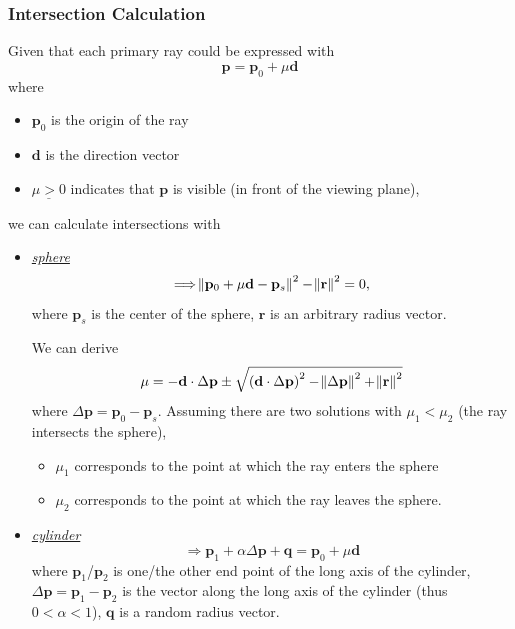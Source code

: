 \documentclass[twocolumn,landscape,10pt]{article}
\theoremstyle{definition}
\begin{document}
\subsubsection{Intersection Calculation}

Given that each primary ray could be expressed with
\[
    \mathbf{p}=\mathbf{p}_0+\mu\mathbf{d}
\]
where
\begin{itemize}
    \item $\mathbf{p}_0$ is the origin of the ray
    \item $\mathbf{d}$ is the direction vector
    \item $\underline{\mu>0}$ indicates that $\mathbf{p}$ is visible 
        (in front of the viewing plane),
\end{itemize} 
we can calculate intersections with
\begin{itemize}
    \item \underline{\emph{sphere}}
        \[
            \Longrightarrow
            \norm{\mathbf{p}_0+\mu\mathbf{d}-\mathbf{p}_s}^2-\norm{\mathbf{r}}^2=0,
        \]
        where $\mathbf{p}_s$ is the center of the sphere, $\mathbf{r}$ is an
        arbitrary radius vector.

        We can derive
        \[
            \mu=-\mathbf{d}\cdot\Delta\mathbf{p}\pm\sqrt{
                {(\mathbf{d}\cdot\Delta\mathbf{p})}^{2}
                -\norm{\Delta\mathbf{p}}^{2}+\norm{\mathbf{r}}^2
            }
        \]
        where $\Delta\mathbf{p}=\mathbf{p}_0-\mathbf{p}_s$.
        Assuming there are two solutions with $\mu_1<\mu_2$ (the ray intersects
        the sphere), 
        \begin{itemize}
            \item $\mu_1$ corresponds to the point at which the ray enters the sphere
            \item $\mu_2$ corresponds to the point at which the ray leaves the sphere.
        \end{itemize} 

    \item \underline{\emph{cylinder}}
        \[
            \Longrightarrow
            \mathbf{p}_1+\alpha\Delta\mathbf{p}+\mathbf{q}=\mathbf{p}_0+\mu\mathbf{d}
        \]
        where $\mathbf{p}_1$/$\mathbf{p}_2$ is one/the other end point of the 
        long axis of the cylinder, $\Delta\mathbf{p}=\mathbf{p}_1-\mathbf{p}_2$ 
        is the vector along the long axis of the cylinder (thus $0<\alpha<1$), 
        $\mathbf{q}$ is a random radius vector.


\end{itemize}
\end{document}
